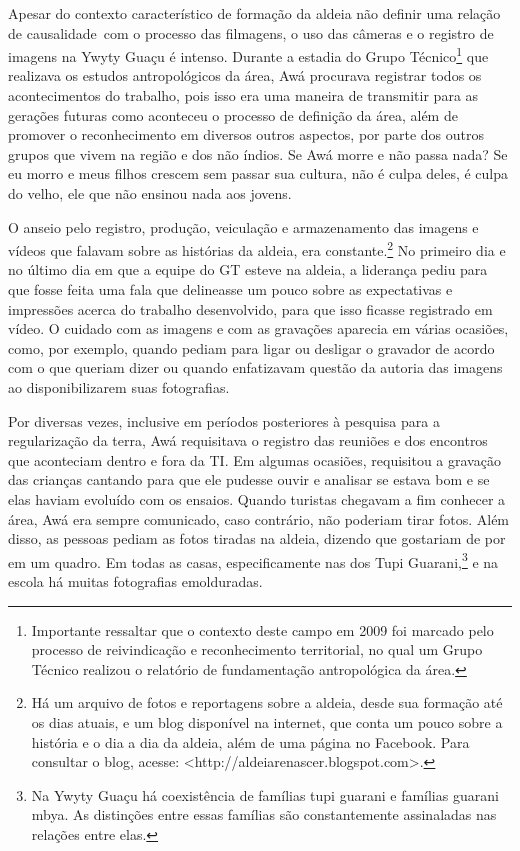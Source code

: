 \documentclass{article}
\begin{document}
Apesar do contexto caracter\'istico de forma\c{c}\~ao da aldeia n\~ao
definir uma rela\c{c}\~ao de causalidade~com o processo das filmagens,
o uso das c\^ameras e o registro de imagens na Ywyty Gua\c{c}u \'e
intenso. Durante a estadia do Grupo T\'ecnico\footnote{ Importante
ressaltar que o contexto deste campo em 2009 foi marcado pelo processo
de reivindica\c{c}\~ao e reconhecimento territorial, no qual um Grupo
T\'ecnico realizou o relat\'orio de fundamenta\c{c}\~ao antropol\'ogica
da \'area.} que realizava os estudos antropol\'ogicos da \'area, Aw\'a
procurava registrar todos os acontecimentos do trabalho, pois isso era
uma maneira de transmitir para as gera\c{c}\~oes futuras como aconteceu
o processo de defini\c{c}\~ao da \'area, al\'em de promover o
reconhecimento em diversos outros aspectos, por parte dos outros grupos
que vivem na regi\~ao e dos n\~ao \'indios. Se Aw\'a morre e n\~ao
passa nada? Se eu morro e meus filhos crescem sem passar sua cultura,
n\~ao \'e culpa deles, \'e culpa do velho, ele que n\~ao ensinou nada
aos jovens. 

O anseio pelo registro, produ\c{c}\~ao, veicula\c{c}\~ao e armazenamento
das imagens e v\'ideos que falavam sobre as hist\'orias da aldeia, era
constante.\footnote{ H\'a um arquivo de fotos e reportagens sobre a
aldeia, desde sua forma\c{c}\~ao at\'e os dias atuais, e um blog
dispon\'ivel na internet, que conta um pouco sobre a hist\'oria e o dia
a dia da aldeia, al\'em de uma p\'agina no Facebook. Para consultar o
blog, acesse:
{\textless}http://aldeiarenascer.blogspot.com{\textgreater}.} No
primeiro dia e no \'ultimo dia em que a equipe do GT esteve na aldeia,
a lideran\c{c}a pediu para que fosse feita uma fala que delineasse um
pouco sobre as expectativas e impress\~oes acerca do trabalho
desenvolvido, para que isso ficasse registrado em v\'ideo. O cuidado
com as imagens e com as grava\c{c}\~oes aparecia em v\'arias
ocasi\~oes, como, por exemplo, quando pediam para ligar ou desligar o
gravador de acordo com o que queriam dizer ou quando enfatizavam
quest\~ao da autoria das imagens ao disponibilizarem suas fotografias.

Por diversas vezes, inclusive em per\'iodos posteriores \`a pesquisa
para a regulariza\c{c}\~ao da terra, Aw\'a requisitava o registro das
reuni\~oes e dos encontros que aconteciam dentro e fora da TI. Em
algumas ocasi\~oes, requisitou a grava\c{c}\~ao das crian\c{c}as
cantando para que ele pudesse ouvir e analisar se estava bom e se elas
haviam evolu\'ido com os ensaios. Quando turistas chegavam a fim
conhecer a \'area, Aw\'a era sempre comunicado, caso contr\'ario, n\~ao
poderiam tirar fotos. Al\'em disso, as pessoas pediam as fotos tiradas
na aldeia, dizendo que gostariam de por em um quadro. Em todas as
casas, especificamente nas dos Tupi Guarani,\footnote{ Na Ywyty
Gua\c{c}u h\'a coexist\^encia de fam\'ilias tupi guarani e fam\'ilias
guarani mbya. As distin\c{c}\~oes entre essas fam\'ilias s\~ao
constantemente assinaladas nas rela\c{c}\~oes entre elas. } e na escola
h\'a muitas fotografias emolduradas.
\end{document}

